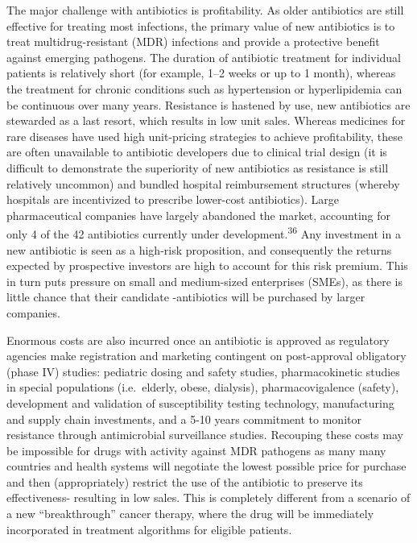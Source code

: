 \documentclass[
  11pt,
  paper=a4,
  ,captions=tableheading
]{scrartcl}
\renewenvironment{quote}{\begin{customblockquote}\list{}{\rightmargin=0em\leftmargin=0em}%
\item\relax\color{blockquote-text}\ignorespaces}{\unskip\unskip\endlist\end{customblockquote}}
\begin{document}
\begin{quote}
The major challenge with antibiotics is profitability. As older
antibiotics are still effective for treating most infections, the
primary value of new antibiotics is to treat multidrug-resistant (MDR)
infections and provide a protective benefit against emerging pathogens.
The duration of antibiotic treatment for individual patients is
relatively short (for example, 1--2 weeks or up to 1 month), whereas the
treatment for chronic conditions such as hypertension or hyperlipidemia
can be continuous over many years. Resistance is hastened by use, new
antibiotics are stewarded as a last resort, which results in low unit
sales. Whereas medicines for rare diseases have used high unit-pricing
strategies to achieve profitability, these are often unavailable to
antibiotic developers due to clinical trial design (it is difficult to
demonstrate the superiority of new antibiotics as resistance is still
relatively uncommon) and bundled hospital reimbursement structures
(whereby hospitals are incentivized to prescribe lower-cost
antibiotics). Large pharmaceutical companies have largely abandoned the
market, accounting for only 4 of the 42 antibiotics currently under
development.\textsuperscript{36} Any investment in a new antibiotic is
seen as a high-risk proposition, and consequently the returns expected
by prospective investors are high to account for this risk premium. This
in turn puts pressure on small and medium-sized enterprises (SMEs), as
there is little chance that their candidate -antibiotics will be
purchased by larger companies.
\end{quote}

Enormous costs are also incurred once an antibiotic is approved as
regulatory agencies make registration and marketing contingent on
post-approval obligatory (phase IV) studies: pediatric dosing and safety
studies, pharmacokinetic studies in special populations (i.e.~elderly,
obese, dialysis), pharmacovigalence (safety), development and validation
of susceptibility testing technology, manufacturing and supply chain
investments, and a 5-10 years commitment to monitor resistance through
antimicrobial surveillance studies. Recouping these costs may be
impossible for drugs with activity against MDR pathogens as many many
countries and health systems will negotiate the lowest possible price
for purchase and then (appropriately) restrict the use of the antibiotic
to preserve its effectiveness- resulting in low sales. This is
completely different from a scenario of a new ``breakthrough'' cancer
therapy, where the drug will be immediately incorporated in treatment
algorithms for eligible patients.
\end{document}
